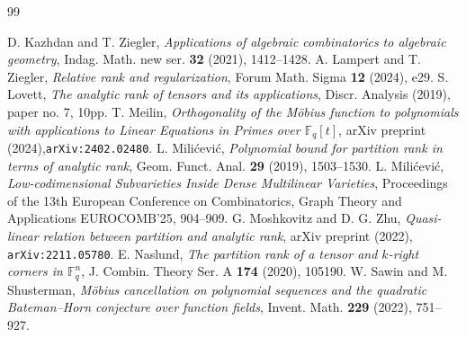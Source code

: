\documentclass[a4paper,11pt]{article}
\theoremstyle{definition}
\renewenvironment{thebibliography}[1]
{
  \begin{oldthebibliography}{#1}
    \setlength{\itemsep}{0em  plus 0.3ex}
    \setlength{\parskip}{0em}
}
{
  \end{oldthebibliography}
}
\begin{document}
\begin{thebibliography}{99}
     D. Kazhdan and T. Ziegler, \textit{Applications of algebraic combinatorics to algebraic geometry}, Indag. Math. new ser. \textbf{32} (2021), 1412--1428.
     A. Lampert and T. Ziegler, \textit{Relative rank and regularization}, Forum Math. Sigma \textbf{12} (2024), e29.
     S. Lovett, \textit{The analytic rank of tensors and its applications}, Discr. Analysis (2019), paper no. 7, 10pp.
     T. Meilin, \textit{Orthogonality of the M\"obius function to polynomials with applications to Linear Equations in Primes over $\mathbb{F}_q[t]$}, arXiv preprint (2024),\verb+arXiv:2402.02480+.
     L. Mili\'cevi\'c, \textit{Polynomial bound for partition rank in terms of analytic rank}, Geom. Funct. Anal. \textbf{29} (2019), 1503--1530.
     L. Mili\'cevi\'c, \textit{Low-codimensional Subvarieties Inside Dense Multilinear Varieties}, Proceedings of the 13th European Conference on Combinatorics, Graph Theory and Applications EUROCOMB'25, 904--909.
     G. Moshkovitz and D. G. Zhu, \emph{Quasi-linear relation between partition and analytic rank}, arXiv preprint (2022), \verb+arXiv:2211.05780+.
     E. Naslund, \textit{The partition rank of a tensor and $k$-right corners in $\mathbb{F}_q^n$}, J. Combin. Theory Ser. A \textbf{174} (2020), 105190.
     W. Sawin and M. Shusterman, \textit{M\"obius cancellation on polynomial sequences and the quadratic Bateman–Horn conjecture over function fields}, Invent. Math. \textbf{229} (2022), 751--927.
\end{thebibliography}
\end{document}
